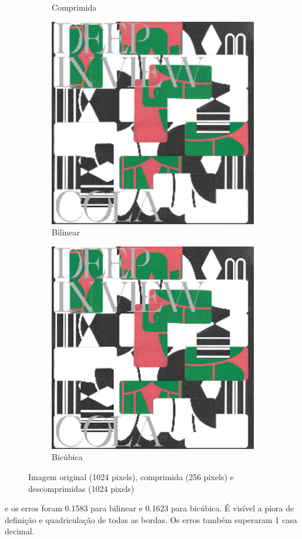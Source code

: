 \documentclass{article}
\begin{document}
\begin{figure}[ht]
\begin{subfigure}{0.48\textwidth}
    \caption{Comprimida}
  \end{subfigure}%
  \hfill
  \begin{subfigure}{0.48\textwidth}
    \centering
    \includegraphics[width=\textwidth]{imagens-reais/deep-in-view/decompressed-bilinear.png}
    \caption{Bilinear}
  \end{subfigure}%
  \hfill
  \begin{subfigure}{0.48\textwidth}
    \centering
    \includegraphics[width=\textwidth]{imagens-reais/deep-in-view/decompressed-bicubica.png}
    \caption{Bicúbica}
  \end{subfigure}
  \caption{Imagem original (1024 pixels), comprimida (256 pixels) e descomprimidas (1024 pixels)}
\end{figure}

e os erros foram 0.1583 para bilinear e 0.1623 para bicúbica.
É visível a piora de definição e quadriculação de todas as bordas.
Os erros também superaram 1 casa decimal.
\end{document}
